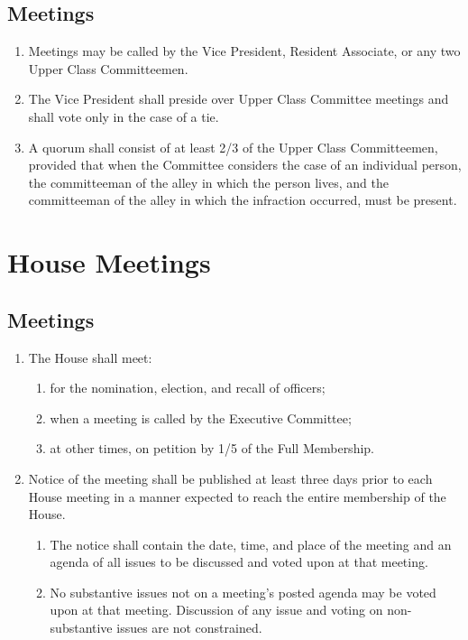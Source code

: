 \documentclass[10pt]{article} %
\begin{document}
\subsection{Meetings}
\begin{enumerate}
\item Meetings may be called by the Vice President, Resident Associate, or any two Upper Class Committeemen.
\item The Vice President shall preside over Upper Class Committee meetings and shall vote only in the case of a tie.
\item A quorum shall consist of at least 2/3 of the Upper Class Committeemen, provided that when the Committee considers the case of an individual person, the committeeman of the alley in which the person lives, and the committeeman of the alley in which the infraction occurred, must be present.
\end{enumerate}
\section{House Meetings}
\subsection{Meetings}
\begin{enumerate}
\item The House shall meet:
\begin{enumerate}
\item for the nomination, election, and recall of officers;
\item when a meeting is called by the Executive Committee;
\item at other times, on petition by 1/5 of the Full Membership.
\end{enumerate}
\item Notice of the meeting shall be published at least three days prior to each House meeting in a manner expected to reach the entire membership of the House.
\begin{enumerate}
\item The notice shall contain the date, time, and place of the meeting and an agenda of all issues to be discussed and voted upon at that meeting.
\item No substantive issues not on a meeting’s posted agenda may be voted upon at that meeting. Discussion of any issue and voting on non-substantive issues are not constrained.
\end{enumerate}
\end{enumerate}
\end{document}
